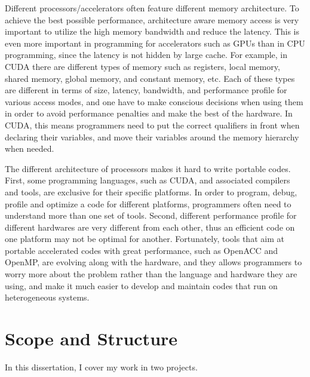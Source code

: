 Different processors/accelerators often feature different memory architecture.
To achieve the best possible performance, architecture aware memory access is 
very important to utilize the high memory bandwidth and reduce the latency.
This is even more important in programming for accelerators such as GPUs than in
CPU programming, since the latency is not hidden by large cache.
For example, in CUDA %
there are different types of memory such as registers, local memory, shared 
memory, global memory, and constant memory, etc. Each of these types are 
different in terms of size, latency, bandwidth, and performance profile for 
various access modes, and one have to make conscious decisions when using them
in order to avoid performance penalties and make the best of the hardware. 
In CUDA, this means programmers need to put the correct qualifiers in front when 
declaring their variables, and move their variables around the memory hierarchy 
when needed.
 

The different architecture of processors makes it hard to write portable codes.
First, some programming languages, such as CUDA, and associated compilers and tools,
 are exclusive for their specific platforms. In order to program, debug, profile 
and optimize a code for different platforms, programmers often need to understand 
more than one set of tools. 
Second, different performance profile for different hardwares are very
different from each other, thus an efficient code on one platform may not be
optimal for another. 
Fortunately, tools that aim at portable accelerated codes with great performance, such as 
OpenACC and OpenMP, are evolving along with the hardware, and they allows programmers
to worry more about the problem rather than the language and hardware they are
using, and make it much easier to develop and maintain codes that run on heterogeneous systems.





\section{Scope and Structure}
In this dissertation, I cover my work in two projects.

